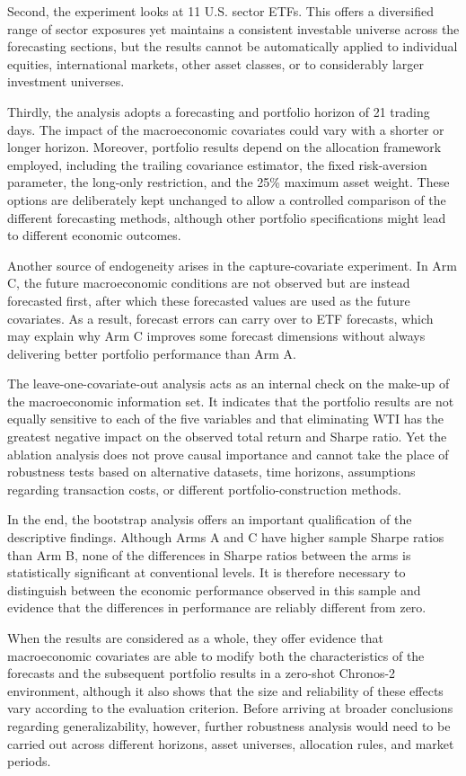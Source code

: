 \documentclass[12pt,a4paper,twoside,openany]{book}
\begin{document}
Second, the experiment looks at 11 U.S. sector ETFs. This offers a diversified range of sector exposures yet maintains a consistent investable universe across the forecasting sections, but the results cannot be automatically applied to individual equities, international markets, other asset classes, or to considerably larger investment universes.

Thirdly, the analysis adopts a forecasting and portfolio horizon of 21 trading days. The impact of the macroeconomic covariates could vary with a shorter or longer horizon. Moreover, portfolio results depend on the allocation framework employed, including the trailing covariance estimator, the fixed risk-aversion parameter, the long-only restriction, and the 25\% maximum asset weight. These options are deliberately kept unchanged to allow a controlled comparison of the different forecasting methods, although other portfolio specifications might lead to different economic outcomes.

Another source of endogeneity arises in the capture-covariate experiment. In Arm C, the future macroeconomic conditions are not observed but are instead forecasted first, after which these forecasted values are used as the future covariates. As a result, forecast errors can carry over to ETF forecasts, which may explain why Arm C improves some forecast dimensions without always delivering better portfolio performance than Arm A.

The leave-one-covariate-out analysis acts as an internal check on the make-up of the macroeconomic information set. It indicates that the portfolio results are not equally sensitive to each of the five variables and that eliminating WTI has the greatest negative impact on the observed total return and Sharpe ratio. Yet the ablation analysis does not prove causal importance and cannot take the place of robustness tests based on alternative datasets, time horizons, assumptions regarding transaction costs, or different portfolio-construction methods.

In the end, the bootstrap analysis offers an important qualification of the descriptive findings. Although Arms A and C have higher sample Sharpe ratios than Arm B, none of the differences in Sharpe ratios between the arms is statistically significant at conventional levels. It is therefore necessary to distinguish between the economic performance observed in this sample and evidence that the differences in performance are reliably different from zero.

When the results are considered as a whole, they offer evidence that macroeconomic covariates are able to modify both the characteristics of the forecasts and the subsequent portfolio results in a zero-shot Chronos-2 environment, although it also shows that the size and reliability of these effects vary according to the evaluation criterion. Before arriving at broader conclusions regarding generalizability, however, further robustness analysis would need to be carried out across different horizons, asset universes, allocation rules, and market periods.
\end{document}
